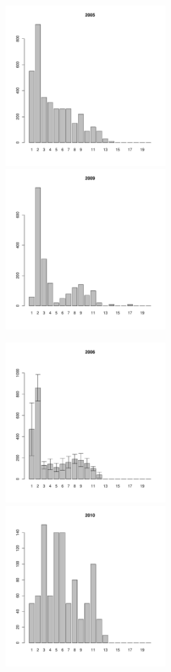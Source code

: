 \begin{figure}[h]
\begin{multicols}{3}
\hfill
\includegraphics[width=60mm]{../White_Sea/Luvenga_Goreliy/high_2005_.pdf}
\hfill
\includegraphics[width=60mm]{../White_Sea/Luvenga_Goreliy/high_2009_.pdf}
\end{multicols}


\begin{multicols}{3}
\hfill
\includegraphics[width=60mm]{../White_Sea/Luvenga_Goreliy/high_2006_.pdf}
\hfill
\includegraphics[width=60mm]{../White_Sea/Luvenga_Goreliy/high_2010_.pdf}
\end{multicols}


\end{figure}
